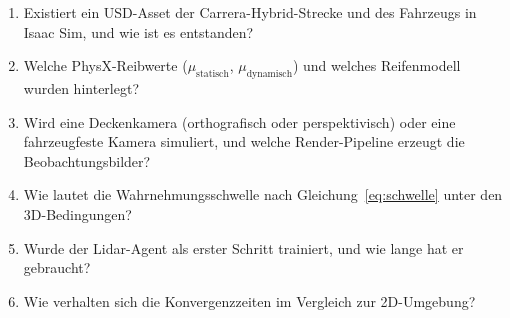 \begin{enumerate}
  \item Existiert ein USD-Asset der Carrera-Hybrid-Strecke und des Fahrzeugs in Isaac Sim, und wie ist es entstanden?
  \item Welche PhysX-Reibwerte ($\mu_{\text{statisch}}$, $\mu_{\text{dynamisch}}$) und welches Reifenmodell wurden hinterlegt?
  \item Wird eine Deckenkamera (orthografisch oder perspektivisch) oder eine fahrzeugfeste Kamera simuliert, und welche Render-Pipeline erzeugt die Beobachtungsbilder?
  \item Wie lautet die Wahrnehmungsschwelle nach Gleichung~\eqref{eq:schwelle} unter den 3D-Bedingungen?
  \item Wurde der Lidar-Agent als erster Schritt trainiert, und wie lange hat er gebraucht?
  \item Wie verhalten sich die Konvergenzzeiten im Vergleich zur 2D-Umgebung?
\end{enumerate}
